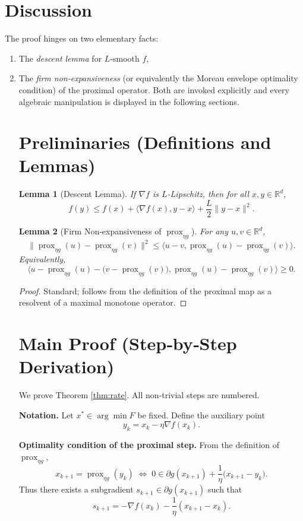 \documentclass{article}
\newtheorem{lemma}{Lemma}
\begin{document}
\section*{Discussion}
The proof hinges on two elementary facts:
\begin{enumerate}
\item The \emph{descent lemma} for $L$‑smooth $f$,
\item The \emph{firm non‑expansiveness} (or equivalently the Moreau envelope optimality condition) of the proximal operator.  
Both are invoked explicitly and every algebraic manipulation is displayed in the following sections.

\newpage
\section*{Preliminaries (Definitions and Lemmas)}
\begin{lemma}[Descent Lemma]\label{lem:descent}
If $\nabla f$ is $L$‑Lipschitz, then for all $x,y\in\mathbb{R}^{d}$,
\[
f(y)\le f(x)+\langle\nabla f(x),y-x\rangle+\frac{L}{2}\|y-x\|^{2}.
\]
\end{lemma}
\begin{lemma}[Firm Non‑expansiveness of $\operatorname{prox}_{\eta g}$]\label{lem:firm}
For any $u,v\in\mathbb{R}^{d}$,
\[
\|\operatorname{prox}_{\eta g}(u)-\operatorname{prox}_{\eta g}(v)\|^{2}
\le \langle u-v,\operatorname{prox}_{\eta g}(u)-\operatorname{prox}_{\eta g}(v)\rangle .
\]
Equivalently,
\[
\langle u-\operatorname{prox}_{\eta g}(u)-\bigl(v-\operatorname{prox}_{\eta g}(v)\bigr),
\operatorname{prox}_{\eta g}(u)-\operatorname{prox}_{\eta g}(v)\rangle\ge 0 .
\]
\end{lemma}
\begin{proof}
Standard; follows from the definition of the proximal map as a resolvent of a maximal monotone operator. \qedhere
\end{proof}

\section*{Main Proof (Step‑by‑Step Derivation)}
We prove Theorem \ref{thm:rate}.  All non‑trivial steps are numbered.

\noindent\textbf{Notation.}  Let $x^{*}\in\arg\min F$ be fixed.  Define the auxiliary point
\[
y_{k}=x_{k}-\eta\nabla f(x_{k}) .
\]

\noindent\textbf{Optimality condition of the proximal step.}
From the definition of $\operatorname{prox}_{\eta g}$,
\[
x_{k+1}= \operatorname{prox}_{\eta g}(y_{k})
\;\Longleftrightarrow\;
0\in \partial g(x_{k+1})+\frac{1}{\eta}\bigl(x_{k+1}-y_{k}\bigr).
\]
Thus there exists a subgradient $s_{k+1}\in\partial g(x_{k+1})$ such that
\[
s_{k+1}= -\nabla f(x_{k})-\frac{1}{\eta}(x_{k+1}-x_{k}). \tag{1}
\]


\end{enumerate}
\end{document}
